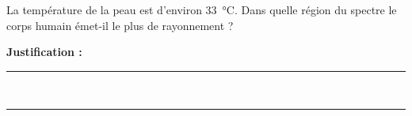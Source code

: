 La température de la peau est d'environ \qty{33}{\degreeCelsius}. Dans quelle région du spectre le corps humain émet-il le plus de rayonnement ?

\choices

\noindent\textbf{Justification :} \hrulefill \\[2.5ex]
\rule{\linewidth}{0.4pt} \\[2.5ex]
\rule{\linewidth}{0.4pt}
\vfill
